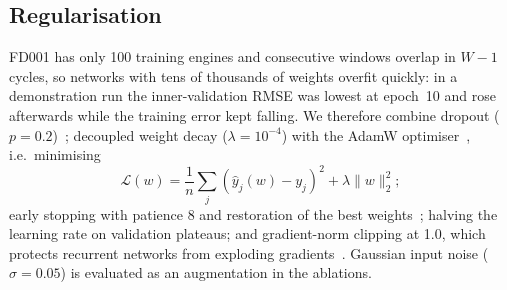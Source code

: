 \subsection{Regularisation}
FD001 has only 100 training engines and consecutive windows overlap in $W-1$ cycles, so networks with tens of thousands of weights overfit quickly: in a demonstration run the inner-validation RMSE was lowest at epoch~10 and rose afterwards while the training error kept falling. We therefore combine dropout ($p=0.2$)~\cite{srivastava2014dropout}; decoupled weight decay ($\lambda=10^{-4}$) with the AdamW optimiser~\cite{kingma2015adam,loshchilov2019adamw}, i.e.\ minimising
\begin{equation}
  \mathcal{L}(w)=\frac{1}{n}\sum_{j}\left(\hat y_j(w)-y_j\right)^2+\lambda\lVert w\rVert_2^2;
\end{equation}
early stopping with patience 8 and restoration of the best weights~\cite{prechelt1998early}; halving the learning rate on validation plateaus; and gradient-norm clipping at 1.0, which protects recurrent networks from exploding gradients~\cite{pascanu2013difficulty}. Gaussian input noise ($\sigma=0.05$) is evaluated as an augmentation in the ablations.
